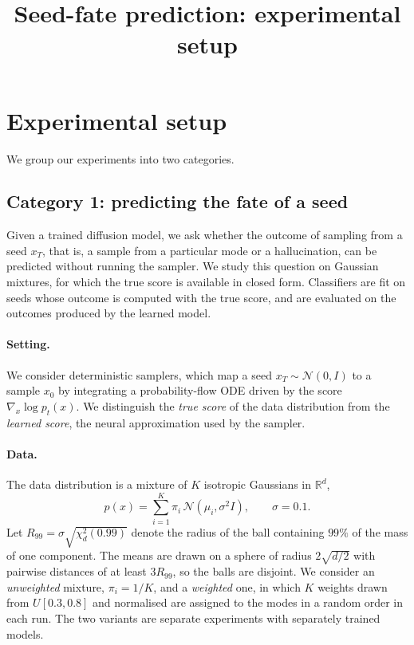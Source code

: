 \documentclass[11pt]{article}
\title{Seed-fate prediction: experimental setup}
\date{}
\begin{document}
\maketitle

\section{Experimental setup}
\begingroup
\setlength{\parskip}{0.8em plus 0.2em}
\setlength{\parindent}{0pt}

We group our experiments into two categories.

\subsection{Category 1: predicting the fate of a seed}

Given a trained diffusion model, we ask whether the outcome of sampling from a seed $x_T$, that
is, a sample from a particular mode or a hallucination, can be predicted without running the
sampler. We study this question on Gaussian mixtures, for which the true score is available in
closed form. Classifiers are fit on seeds whose outcome is computed with the true score, and are
evaluated on the outcomes produced by the learned model.

\paragraph{Setting.}
We consider deterministic samplers, which map a seed $x_T \sim \mathcal{N}(0, I)$ to a sample $x_0$
by integrating a probability-flow ODE driven by the score $\nabla_x \log p_t(x)$. We distinguish
the \emph{true score} of the data distribution from the \emph{learned score}, the neural
approximation used by the sampler.

\paragraph{Data.}
The data distribution is a mixture of $K$ isotropic Gaussians in $\mathbb{R}^d$,
\begin{equation}
    p(x) = \sum_{i=1}^{K} \pi_i \, \mathcal{N}(\mu_i, \sigma^2 I), \qquad \sigma = 0.1.
\end{equation}
Let $R_{99} = \sigma \sqrt{\chi^2_d(0.99)}$ denote the radius of the ball containing $99\%$ of the
mass of one component. The means are drawn on a sphere of radius $2\sqrt{d/2}$ with pairwise
distances of at least $3R_{99}$, so the balls are disjoint. We consider an \emph{unweighted}
mixture, $\pi_i = 1/K$, and a \emph{weighted} one, in which $K$ weights drawn from $U[0.3, 0.8]$
and normalised are assigned to the modes in a random order in each run. The two variants are
separate experiments with separately trained models.
\end{document}
